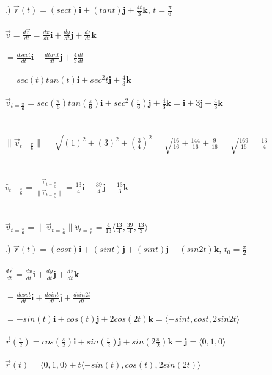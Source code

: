\documentclass[12pt]{article}
\begin{document}
.) $\vec{r}(t) = (sec{t})\mathbf{i} + (tan{t})\mathbf{j} + \frac{4t}{3}\mathbf{k}$, \hspace{10pt} $t = \frac{\pi}{6}$\\\\
\noindent $\vec{v} = \frac{d\vec{r}}{dt} = \frac{dx}{dt}\mathbf{i} + \frac{dy}{dt}\mathbf{j} + \frac{dz}{dt}\mathbf{k}$\\\\
\noindent $= \frac{dsec{t}}{dt}\mathbf{i} + \frac{dtan{t}}{dt}\mathbf{j} + \frac{4}{3}\frac{dt}{dt}$\\\\
\noindent $= sec(t)tan(t)\mathbf{i} + sec^{2}{t} \mathbf{j} + \frac{4}{3}\mathbf{k}$\\\\
\noindent $\vec{v}_{t = \frac{\pi}{6}} = sec(\frac{\pi}{6})tan(\frac{\pi}{6})\mathbf{i} + sec^{2}(\frac{\pi}{6}) \mathbf{j} + \frac{4}{3}\mathbf{k} = \mathbf{i} + 3\mathbf{j} + \frac{4}{3}\mathbf{k}$\\\\\\
\noindent $ \| \vec{v}_{t = \frac{\pi}{6}} \|  = \sqrt{(1)^{2} + (3)^{2} + (\frac{3}{4})^{2}} =\sqrt{\frac{16}{16} + \frac{144}{16} + \frac{9}{16}} = \sqrt{\frac{169}{16}} = \frac{13}{4}$\\\\\\
\noindent $\hat{v}_{t = \frac{\pi}{6}} = \frac{\vec{v}_{t = \frac{\pi}{6}}}{ \| \vec{v}_{t = \frac{\pi}{6}} \| } = \frac{13}{4}\mathbf{i} + \frac{39}{4}\mathbf{j} + \frac{13}{3}\mathbf{k}$\\\\\\
\noindent $\vec{v}_{t = \frac{\pi}{6}} = \| \vec{v}_{t = \frac{\pi}{6}} \| \hat{v}_{t = \frac{\pi}{6}} 
= \frac{4}{13} \langle  \frac{13}{4}, \frac{39}{4}, \frac{13}{3}\rangle$\clearpage


.) $\vec{r}(t) = (cos{t})\mathbf{i} + (sin{t})\mathbf{j} + (sin{t})\mathbf{j} + (sin{2t})\mathbf{k}$, \hspace{10pt} $t_{0} = \frac{\pi}{2}$\\\\
\noindent $\frac{d\vec{r}}{dt} = \frac{dx}{dt}\mathbf{i} + \frac{dy}{dt}\mathbf{j} + \frac{dz}{dt}\mathbf{k}$\\\\
\noindent $ = \frac{dcos{t}}{dt}\mathbf{i} + \frac{dsin{t}}{dt}\mathbf{j} + \frac{dsin{2t}}{dt}$\\\\
\noindent $ = -sin(t)\mathbf{i} + cos(t)\mathbf{j} + 2cos(2t)\mathbf{k} = \langle -sin{t}, cos{t}, 2sin{2t}\rangle$\\\\
\noindent $\vec{r}(\frac{\pi}{2}) = cos(\frac{\pi}{2})\mathbf{i} + sin(\frac{\pi}{2})\mathbf{j} + sin(2\frac{\pi}{2})\mathbf{k}= \mathbf{j}  = \langle 0, 1, 0 \rangle$\\\\
\noindent $\vec{r}(t) = \langle 0, 1, 0\rangle + t\langle -sin(t) , cos(t) , 2sin(2t)\rangle$\\\\
\end{document}
